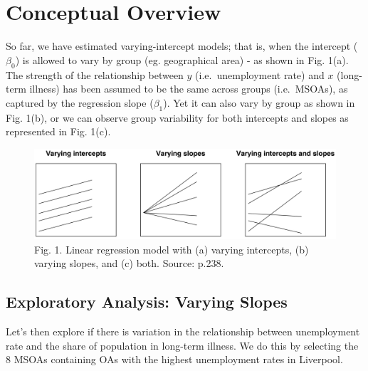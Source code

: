 \documentclass[
]{book}
\newenvironment{Shaded}{\begin{snugshade}}{\end{snugshade}}
\newcommand{\CommentTok}[1]{\textcolor[rgb]{0.56,0.35,0.01}{\textit{#1}}}
\newcommand{\DecValTok}[1]{\textcolor[rgb]{0.00,0.00,0.81}{#1}}
\newcommand{\KeywordTok}[1]{\textcolor[rgb]{0.13,0.29,0.53}{\textbf{#1}}}
\newcommand{\NormalTok}[1]{#1}
\newcommand{\OperatorTok}[1]{\textcolor[rgb]{0.81,0.36,0.00}{\textbf{#1}}}
\newcommand{\StringTok}[1]{\textcolor[rgb]{0.31,0.60,0.02}{#1}}
\begin{document}
\hypertarget{conceptual-overview}{%
\section{Conceptual Overview}\label{conceptual-overview}}

So far, we have estimated varying-intercept models; that is, when the intercept (\(\beta_{0}\)) is allowed to vary by group (eg. geographical area) - as shown in Fig. 1(a). The strength of the relationship between \(y\) (i.e.~unemployment rate) and \(x\) (long-term illness) has been assumed to be the same across groups (i.e.~MSOAs), as captured by the regression slope (\(\beta_{1}\)). Yet it can also vary by group as shown in Fig. 1(b), or we can observe group variability for both intercepts and slopes as represented in Fig. 1(c).

\begin{figure}
\centering
\includegraphics{figs/ch6/fig11.1_Gelman_Hill.png}
\caption{Fig. 1. Linear regression model with (a) varying intercepts, (b) varying slopes, and (c) both. Source: \citet{Gelman_Hill_2006_book} p.238.}
\end{figure}

\hypertarget{exploratory-analysis-varying-slopes}{%
\subsection{Exploratory Analysis: Varying Slopes}\label{exploratory-analysis-varying-slopes}}

Let's then explore if there is variation in the relationship between unemployment rate and the share of population in long-term illness. We do this by selecting the 8 MSOAs containing OAs with the highest unemployment rates in Liverpool.

\begin{Shaded}
\end{Shaded}
\end{document}
